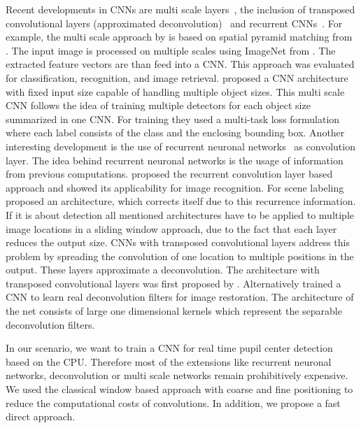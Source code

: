 Recent developments in CNNs are multi scale
layers~\citet{gong2014multi,cai2016unified}, the inclusion of transposed
convolutional layers (approximated deconvolution)~\citet{xu2014deep,
long2015fully} and recurrent
CNNs~\citet{liang2015recurrent,pinheiro2014recurrent}.
For example, the multi scale approach
by \citet{gong2014multi} is based on spatial pyramid matching from
\citet{lazebnik2006beyond}. The input image is processed on multiple scales
using ImageNet from \citet{krizhevsky2012imagenet}. The extracted feature
vectors are than feed into a CNN. This approach was evaluated for
classification, recognition, and image retrieval. \citet{cai2016unified} proposed
a CNN architecture with fixed input size capable of handling multiple object
sizes. This multi scale CNN follows the idea of training multiple detectors for
each object size summarized in one CNN. For training they used a multi-task loss
formulation where each label consists of the class and the enclosing bounding
box. Another interesting development is the use of recurrent neuronal
networks~\citet{carpenter1987massively} as convolution layer. The idea behind
recurrent neuronal networks is the usage of information from previous
computations. \citet{liang2015recurrent} proposed the recurrent convolution
layer based approach and showed its applicability for image recognition. For
scene labeling \citet{pinheiro2014recurrent} proposed an architecture, which
corrects itself due to this recurrence information. If it is about detection all
mentioned architectures have to be applied to multiple image locations in a
sliding window approach, due to the fact that each layer reduces the output
size. CNNs with transposed convolutional layers address this problem by
spreading the convolution of one location to multiple positions in the output.
These layers approximate a deconvolution. The architecture with transposed
convolutional layers was first proposed by \citet{long2015fully}. Alternatively
\citet{xu2014deep} trained a CNN to learn real deconvolution filters for image
restoration. The architecture of the net consists of large one dimensional
kernels which represent the separable deconvolution filters.

In our scenario, we want to train a CNN for real time pupil center detection
based on the CPU. Therefore most of the extensions like recurrent neuronal
networks, deconvolution or multi scale networks remain prohibitively expensive.
We used the classical window based approach with coarse and fine positioning to
reduce the computational costs of convolutions. In addition, we propose a fast
direct approach.


